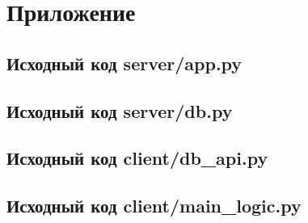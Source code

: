 \clearpage
\section{Приложение}
\subsection{Исходный код server/app.py}



\clearpage
\subsection{Исходный код server/db.py}



% 


\clearpage
\subsection{Исходный код client/db\_api.py}



\clearpage
\subsection{Исходный код client/main\_logic.py}



\clearpage
{}
\nocite{*}
\printbibliography{}